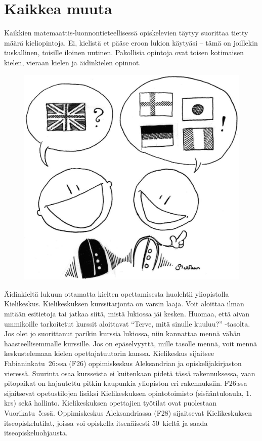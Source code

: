 \documentclass[a5paper, 8pt, twocolumn]{book} %
\numberwithin{equation}{section}
\begin{document}
\chapter{Kaikkea muuta}
Kaikkien matemaattis-luonnon\-tieteellisessä
opiskelevien täytyy suorittaa tietty
määrä kieliopintoja. Ei, kielistä et pääse
eroon lukion käytyäsi -- tämä on joillekin
tuskallinen, toisille iloinen uutinen. Pakollisia
opintoja ovat toisen kotimaisen kielen,
vieraan kielen ja äidinkielen opinnot.
\begin{figure}[!b]
	\includegraphics[width=\columnwidth]{kielijuttu.png}
\end{figure}

Äidinkieltä lukuun ottamatta kielten
opettamisesta huolehtii yliopistolla Kielikeskus. Kielikeskuksen
kurssitarjonta on varsin laaja. Voit aloittaa
ilman mitään esitietoja tai jatkaa siitä, mistä
lukiossa jäi kesken. Huomaa, että aivan
ummikoille tarkoitetut kurssit aloittavat
``Terve, mitä sinulle kuuluu?'' -tasolta. Jos
olet jo suorittanut parikin kurssia lukiossa,
niin kannattaa mennä vähän haasteellisemmalle
kurssille. Jos on epäselvyyttä, mille
tasolle mennä, voit mennä keskustelemaan
kielen opettajatuutorin kanssa. Kielikeskus
sijaitsee Fabianinkatu~26:ssa (F26) oppimiskeskus Aleksandrian ja opiskelijakirjaston
vieressä. Suurinta osaa kursseista
ei kuitenkaan pidetä tässä rakennuksessa,
vaan pitopaikat on hajautettu pitkin kaupunkia
yliopiston eri rakennuksiin. F26:ssa
sijaitsevat opetustilojen lisäksi Kielikeskuksen
opintotoimisto (sisääntuloaula, 1.\,krs) sekä hallinto. Kielikeskuksen opettajien
työtilat ovat puolestaan Vuorikatu~5:ssä.
Oppimiskeskus Aleksandriassa (F28) sijaitsevat
Kielikeskuksen itseopiskelutilat,
joissa voi opiskella itsenäisesti 50~kieltä ja
saada itseopiskeluohjausta.
\end{document}
